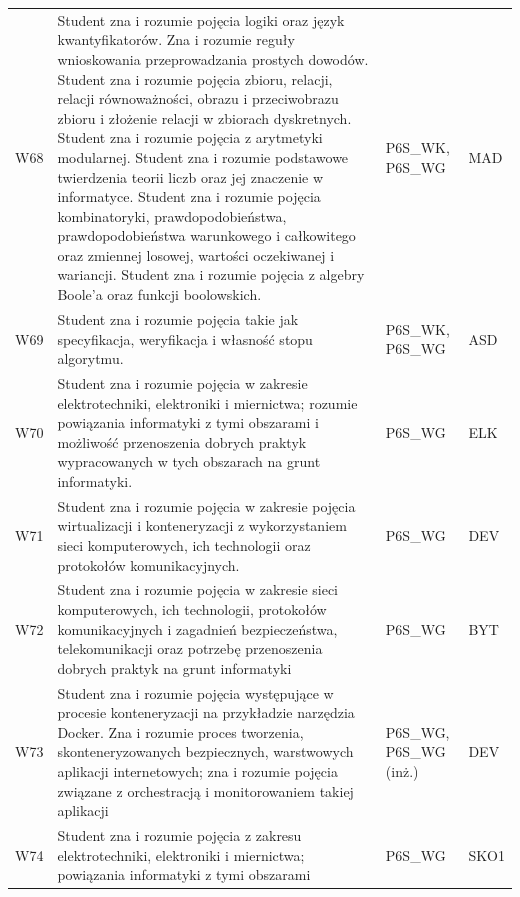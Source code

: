 \documentclass[12pt,a4paper]{article}
\begin{document}
{\begin{longtable}{m{1cm}m{8.8cm}m{2.1cm}m{2.5cm}}
\rowcolor{tableRowAlt} W68 & Student zna i rozumie pojęcia logiki oraz język kwantyfikatorów. Zna i rozumie reguły wnioskowania przeprowadzania prostych dowodów. Student zna i rozumie pojęcia zbioru, relacji, relacji równoważności, obrazu i przeciwobrazu zbioru i złożenie relacji w zbiorach dyskretnych. Student zna i rozumie pojęcia z arytmetyki modularnej. Student zna i rozumie podstawowe twierdzenia teorii liczb oraz jej znaczenie w informatyce. Student zna i rozumie pojęcia kombinatoryki, prawdopodobieństwa, prawdopodobieństwa warunkowego i całkowitego oraz zmiennej losowej, wartości oczekiwanej i wariancji. Student zna i rozumie pojęcia z algebry Boole’a oraz funkcji boolowskich. & {\scriptsize P6S\_WK, P6S\_WG} & {\scriptsize MAD} \\
\rowcolor{tableRowLight} W69 & Student zna i rozumie pojęcia takie jak specyfikacja, weryfikacja i własność stopu algorytmu. & {\scriptsize P6S\_WK, P6S\_WG} & {\scriptsize ASD} \\
\rowcolor{tableRowAlt} W70 & Student zna i rozumie pojęcia w zakresie elektrotechniki, elektroniki i miernictwa; rozumie powiązania informatyki z tymi obszarami i możliwość przenoszenia dobrych praktyk wypracowanych w tych obszarach na grunt informatyki. & {\scriptsize P6S\_WG} & {\scriptsize ELK} \\
\rowcolor{tableRowLight} W71 & Student zna i rozumie pojęcia w zakresie pojęcia wirtualizacji i konteneryzacji z wykorzystaniem sieci komputerowych, ich technologii oraz protokołów komunikacyjnych. & {\scriptsize P6S\_WG} & {\scriptsize DEV} \\
\rowcolor{tableRowAlt} W72 & Student zna i rozumie pojęcia w zakresie sieci komputerowych, ich technologii, protokołów komunikacyjnych i zagadnień bezpieczeństwa, telekomunikacji oraz potrzebę przenoszenia dobrych praktyk na grunt informatyki & {\scriptsize P6S\_WG} & {\scriptsize BYT} \\
\rowcolor{tableRowLight} W73 & Student zna i rozumie pojęcia występujące w procesie konteneryzacji na przykładzie narzędzia Docker. Zna i rozumie proces tworzenia, skonteneryzowanych bezpiecznych, warstwowych aplikacji internetowych; zna i rozumie pojęcia związane z orchestracją i monitorowaniem takiej aplikacji & {\scriptsize P6S\_WG, P6S\_WG {\scriptsize (inż.)}} & {\scriptsize DEV} \\
\rowcolor{tableRowAlt} W74 & Student zna i rozumie pojęcia z zakresu elektrotechniki, elektroniki i miernictwa; powiązania informatyki z tymi obszarami & {\scriptsize P6S\_WG} & {\scriptsize SKO1} \\

\end{longtable}}
\end{document}
